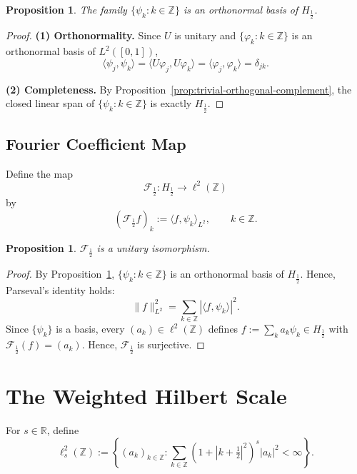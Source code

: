 \documentclass[11pt]{amsart}
\newtheorem{proposition}[theorem]{Proposition}
\theoremstyle{definition}
\theoremstyle{remark}
\begin{document}
\begin{proposition}
\label{prop:ONB}
The family $\{\psi_k : k \in \mathbb{Z}\}$ is an orthonormal basis of $H_{\frac{1}{2}}$.
\end{proposition}

\begin{proof}
\textbf{(1) Orthonormality.}
Since $U$ is unitary and $\{\varphi_k : k \in \mathbb{Z}\}$ is an orthonormal basis of $L^2([0,1])$,
\[
\langle \psi_j, \psi_k \rangle = \langle U\varphi_j, U\varphi_k \rangle = \langle \varphi_j, \varphi_k \rangle = \delta_{jk}.
\]

\textbf{(2) Completeness.}
By Proposition~\ref{prop:trivial-orthogonal-complement}, the closed linear span of $\{\psi_k : k \in \mathbb{Z}\}$ is exactly $H_{\frac{1}{2}}$.
\end{proof}

\subsection{Fourier Coefficient Map}

Define the map
\[
\mathcal{F}_{\frac{1}{2}} : H_{\frac{1}{2}} \to \ell^2(\mathbb{Z})
\]
by
\[
(\mathcal{F}_{\frac{1}{2}} f)_k := \langle f, \psi_k \rangle_{L^2}, \qquad k \in \mathbb{Z}.
\]

\begin{proposition}
\label{prop:unitary-fourier-map}
$\mathcal{F}_{\frac{1}{2}}$ is a unitary isomorphism.
\end{proposition}

\begin{proof}
By Proposition~\ref{prop:ONB}, $\{\psi_k : k \in \mathbb{Z}\}$ is an orthonormal basis of $H_{\frac{1}{2}}$. Hence, Parseval's identity holds:
\[
\|f\|_{L^2}^2 = \sum_{k \in \mathbb{Z}} |\langle f, \psi_k \rangle|^2.
\]
Since $\{\psi_k\}$ is a basis, every $(a_k) \in \ell^2(\mathbb{Z})$ defines $f := \sum_k a_k \psi_k \in H_{\frac{1}{2}}$ with $\mathcal{F}_{\frac{1}{2}}(f) = (a_k)$. Hence, $\mathcal{F}_{\frac{1}{2}}$ is surjective.
\end{proof}

\section{The Weighted Hilbert Scale}
\label{sec:scale}

For $s \in \mathbb{R}$, define
\[
\ell^2_s(\mathbb{Z}) := \left\{ (a_k)_{k \in \mathbb{Z}} : \sum_{k \in \mathbb{Z}} (1 + |k+\tfrac{1}{2}|^2)^s |a_k|^2 < \infty \right\}.
\]
\end{document}
